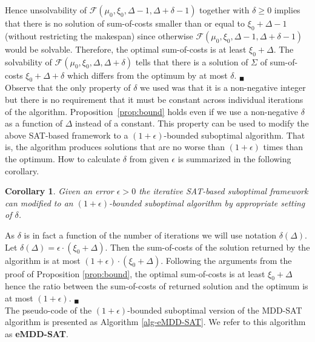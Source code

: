 \documentclass[jair,oneside,11pt]{article}
\newtheorem{definition}{Definition}
\newtheorem{corollary}{Corollary}
\begin{document}
Hence unsolvability of $\mathcal{F}(\mu_0, \xi_0,\Delta-1,\Delta+\delta-1)$ together with $\delta \geq 0$ implies that there is no solution of sum-of-costs smaller than or equal to $\xi_0+\Delta-1$ (without restricting the makespan) since otherwise $\mathcal{F}(\mu_0, \xi_0, \Delta-1,\Delta+\delta-1)$ would be solvable. Therefore, the optimal sum-of-costs is at least $\xi_0+\Delta$. The solvability of $\mathcal{F}(\mu_0, \xi_0,\Delta,\Delta+\delta)$ tells that there is a solution of $\Sigma$ of sum-of-costs $\xi_0+\Delta+\delta$ which differs from the optimum by at most $\delta$. $_\blacksquare$\\

Observe that the only property of $\delta$ we used was that it is a non-negative integer but there is no requirement that it must be constant across individual iterations of the algorithm. Proposition~\ref{prop:bound} holds even if we use a non-negative $\delta$ as a function of $\Delta$ instead of a constant. This property can be used to modify the above SAT-based framework to a $(1+\epsilon)$-bounded suboptimal algorithm. That is, the algorithm produces solutions that are no worse than $(1+\epsilon)$ times than the optimum. How to calculate $\delta$ from given $\epsilon$ is summarized in the following corollary.

\begin{corollary}
Given an error $\epsilon>0$ the iterative SAT-based suboptimal framework can modified to an $(1+\epsilon)$-bounded suboptimal algorithm by appropriate setting of $\delta$.
\end{corollary}

 As $\delta$ is in fact a function of the number of iterations we will use notation $\delta(\Delta)$. Let $\delta(\Delta)=\epsilon \cdot (\xi_0+\Delta)$. Then the sum-of-costs of the solution returned by the algorithm is at most $(1+\epsilon) \cdot (\xi_0+\Delta)$. Following the arguments from the proof of Proposition \ref{prop:bound}, the optimal sum-of-costs is at least $\xi_0+\Delta$ hence the ratio between the sum-of-costs of returned solution and the optimum is at most $(1+\epsilon)$. $_\blacksquare$\\

The pseudo-code of the $(1+\epsilon)$-bounded suboptimal version of the MDD-SAT algorithm is
presented as Algorithm \ref{alg-eMDD-SAT}. We refer to this algorithm as {\bf eMDD-SAT}.


\end{document}
